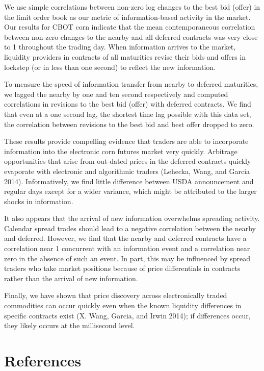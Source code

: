 \documentclass[]{elsarticle} %
\begin{document}
We use simple correlations between non-zero log changes to the best bid
(offer) in the limit order book as our metric of information-based
activity in the market. Our results for CBOT corn indicate that the mean
contemporaneous correlation between non-zero changes to the nearby and
all deferred contracts was very close to 1 throughout the trading day.
When information arrives to the market, liquidity providers in contracts
of all maturities revise their bids and offers in lockstep (or in less
than one second) to reflect the new information.

To measure the speed of information transfer from nearby to deferred
maturities, we lagged the nearby by one and ten second respectively and
computed correlations in revisions to the best bid (offer) with deferred
contracts. We find that even at a one second lag, the shortest time lag
possible with this data set, the correlation between revisions to the
best bid and best offer dropped to zero.

These results provide compelling evidence that traders are able to
incorporate information into the electronic corn futures market very
quickly. Arbitrage opportunities that arise from out-dated prices in the
deferred contracts quickly evaporate with electronic and algorithmic
traders (Lehecka, Wang, and Garcia 2014). Informatively, we find little
difference between USDA announcement and regular days except for a wider
variance, which might be attributed to the larger shocks in information.

It also appears that the arrival of new information overwhelms spreading
activity. Calendar spread trades should lead to a negative correlation
between the nearby and deferred. However, we find that the nearby and
deferred contracts have a correlation near 1 concurrent with an
information event and a correlation near zero in the absence of such an
event. In part, this may be influenced by spread traders who take market
positions because of price differentials in contracts rather than the
arrival of new information.

Finally, we have shown that price discovery across electronically traded
commodities can occur quickly even when the known liquidity differences
in specific contracts exist (X. Wang, Garcia, and Irwin 2014); if
differences occur, they likely occurs at the millisecond level.

\section*{References}\label{references}
\end{document}
